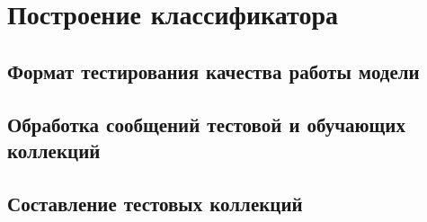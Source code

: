 \newpage
\section{Построение классификатора}
    \subsection{Формат тестирования качества работы модели}
    \subsection{Обработка сообщений тестовой и обучающих коллекций}
    \subsection{Составление тестовых коллекций}
